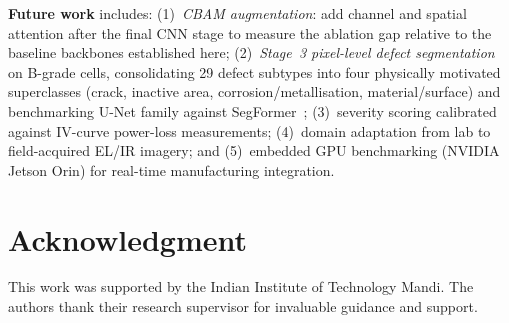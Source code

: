 \documentclass[conference]{IEEEtran}
\begin{document}
\textbf{Future work} includes:
(1)~\textit{CBAM augmentation}: add channel and spatial
attention after the final CNN stage to measure the ablation
gap relative to the baseline backbones established here;
(2)~\textit{Stage~3 pixel-level defect segmentation} on
B-grade cells, consolidating 29 defect subtypes into four
physically motivated superclasses (crack, inactive area,
corrosion/metallisation, material/surface) and benchmarking
U-Net family against SegFormer~\cite{xie2021};
(3)~severity scoring calibrated against IV-curve power-loss
measurements;
(4)~domain adaptation from lab to field-acquired EL/IR imagery;
and
(5)~embedded GPU benchmarking (NVIDIA Jetson Orin) for
real-time manufacturing integration.

\section*{Acknowledgment}

This work was supported by the Indian Institute of Technology
Mandi. The authors thank their research supervisor for
invaluable guidance and support.



\end{document}
